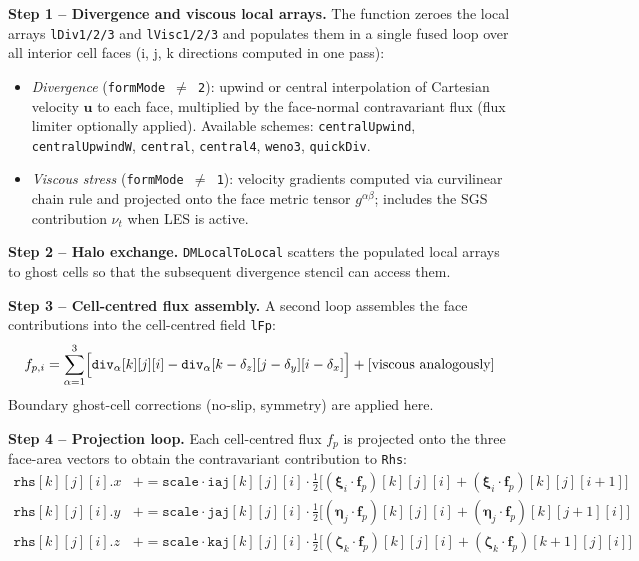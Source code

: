 \documentclass[12pt,a4paper]{article}
\newcommand{\bu}{\bm{u}}
\begin{document}
	\textbf{Step 1 -- Divergence and viscous local arrays.}
	The function zeroes the local arrays
	\texttt{lDiv1/2/3} and \texttt{lVisc1/2/3} and populates them in a
	single fused loop over all interior cell faces
	(i, j, k directions computed in one pass):
	\begin{itemize}
		\item \emph{Divergence} (\texttt{formMode $\neq$ 2}):
		upwind or central interpolation of Cartesian velocity
		$\bu$ to each face, multiplied by the face-normal contravariant
		flux (flux limiter optionally applied).
		Available schemes: \texttt{centralUpwind}, \texttt{centralUpwindW},
		\texttt{central}, \texttt{central4}, \texttt{weno3},
		\texttt{quickDiv}.
		\item \emph{Viscous stress} (\texttt{formMode $\neq$ 1}):
		velocity gradients computed via curvilinear chain rule and
		projected onto the face metric tensor $g^{\alpha\beta}$;
		includes the SGS contribution $\nu_t$ when LES is active.
	\end{itemize}
	
	\textbf{Step 2 -- Halo exchange.}
	\texttt{DMLocalToLocal} scatters the populated local arrays to ghost
	cells so that the subsequent divergence stencil can access them.
	
	\textbf{Step 3 -- Cell-centred flux assembly.}
	A second loop assembles the face contributions into the cell-centred
	field \texttt{lFp}:
	\begin{equation}
		f_{p,i} = \sum_{\alpha=1}^{3}
		\Bigl[\texttt{div}_\alpha[k][j][i] - \texttt{div}_\alpha[k-\delta_z][j-\delta_y][i-\delta_x]\Bigr]
		+ [\text{viscous analogously}]
	\end{equation}
	Boundary ghost-cell corrections (no-slip, symmetry) are applied here.
	
	\textbf{Step 4 -- Projection loop.}
	Each cell-centred flux $f_p$ is projected onto the three face-area
	vectors to obtain the contravariant contribution to \texttt{Rhs}:
	\begin{align}
		\texttt{rhs}[k][j][i].x &\mathrel{+}=
		\texttt{scale} \cdot \texttt{iaj}[k][j][i]
		\cdot \frac{1}{2}\bigl[
		(\bm{\xi}_{i}\cdot \bm{f}_p)[k][j][i]
		+ (\bm{\xi}_{i}\cdot \bm{f}_p)[k][j][i{+}1]
		\bigr] \\
		\texttt{rhs}[k][j][i].y &\mathrel{+}=
		\texttt{scale} \cdot \texttt{jaj}[k][j][i]
		\cdot \frac{1}{2}\bigl[
		(\bm{\eta}_{j}\cdot \bm{f}_p)[k][j][i]
		+ (\bm{\eta}_{j}\cdot \bm{f}_p)[k][j{+}1][i]
		\bigr] \\
		\texttt{rhs}[k][j][i].z &\mathrel{+}=
		\texttt{scale} \cdot \texttt{kaj}[k][j][i]
		\cdot \frac{1}{2}\bigl[
		(\bm{\zeta}_{k}\cdot \bm{f}_p)[k][j][i]
		+ (\bm{\zeta}_{k}\cdot \bm{f}_p)[k{+}1][j][i]
		\bigr]
	\end{align}
	
\end{document}

